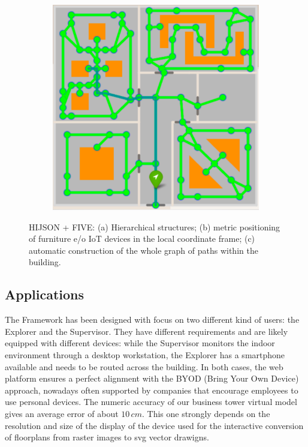 \documentclass[]{egpubl}
\begin{document}
\begin{figure}[!h]
\begin{subfigure}[b]{0.255\linewidth}
  \includegraphics[width=\textwidth]{images/five3} 
  \caption{}
  \end{subfigure}
 
  \caption{HIJSON + FIVE: (a) Hierarchical structures; (b) metric positioning of furniture e/o IoT devices in the local coordinate frame; (c) automatic construction of the whole graph of paths within the building.}
   \label{fig:five-example}
 \end{figure}

\subsection{Applications}\label{sec:five-apps}

The Framework has been designed with focus on two different kind of users: the
Explorer and the Supervisor. They have different requirements and are likely
equipped with different devices: while the Supervisor monitors the indoor
environment through a desktop workstation, the Explorer has a smartphone
available and needs to be routed across the building. In both cases, the web
platform ensures a perfect alignment with the BYOD (Bring Your Own Device)
approach, nowadays often supported by companies that encourage employees to
use personal devices. The numeric accuracy of our business tower virtual model gives an
average error of about $10\,cm$. This one strongly depends on the resolution and size of the display of the device used for the interactive conversion of floorplans from raster images to svg vector drawigns. 
\end{document}
